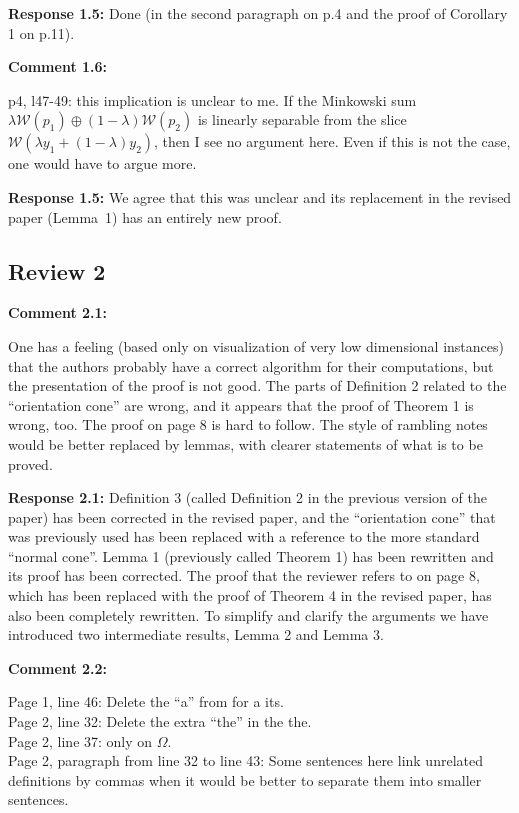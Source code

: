 \documentclass[11pt, a4paper]{article}
\newcommand{\comment}[1]{{%
\begin{sffamily}\leavevmode\color{black}#1
\end{sffamily}}}%
\def\v{\vspace{2mm}}
\begin{document}
\v
\textbf{Response 1.5:}
Done (in the second paragraph on p.4 and the proof of Corollary 1 on p.11).

\v
\textbf{Comment 1.6:}
\comment{
p4, l47-49: this implication is unclear to me. If the Minkowski sum $\lambda \mathcal W (p_1) \oplus (1 - \lambda)\mathcal W(p_2)$ is linearly separable from the slice $\mathcal W(\lambda y_1 + (1 - \lambda)y_2)$, then I see no argument here. Even if this is not the case, one would have to argue more.}

\v
\textbf{Response 1.5:}
We agree that this was unclear and its replacement in the revised paper  (Lemma~1) has an entirely new proof.


\newpage
\subsection*{Review 2}

\textbf{Comment 2.1:}
\comment{One has a feeling (based only on visualization of very low dimensional instances) that the authors probably have a correct algorithm for their computations, but the presentation of the proof is not good. The parts of Definition 2 related to the ``orientation cone'' are wrong, and it appears that the proof of Theorem 1 is wrong, too. The proof on page 8 is hard to follow. The style of rambling notes would be better replaced by lemmas, with clearer statements of what is to be proved.}

\v
\textbf{Response 2.1:}
Definition 3 (called Definition 2 in the previous version of the paper) has been corrected in the revised paper, and the ``orientation cone'' that was previously used has been replaced with a reference to the more standard ``normal cone''. Lemma 1 (previously called Theorem 1) has been rewritten and its proof has been corrected. The proof that the reviewer refers to on page 8, which has been replaced with the proof of Theorem 4 in the revised paper, has also been completely rewritten. To simplify and clarify the arguments we have introduced two intermediate results, Lemma 2 and Lemma 3. 

\textbf{Comment 2.2:}
\comment{
Page 1, line 46: Delete the ``a'' from for a its.\\
Page 2, line 32: Delete the extra ``the'' in the the.\\
Page 2, line 37: only on $\Omega$.\\
Page 2, paragraph from line 32 to line 43: Some sentences here link unrelated definitions by commas when it would be better to separate them into smaller sentences.}
\end{document}
